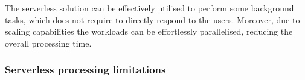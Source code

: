 The serverless solution can be effectively utilised to perform some background tasks, which does not require to directly respond to the users. Moreover, due to scaling capabilities the workloads can be effortlessly parallelised, reducing the overall processing time.







\subsubsection*{Serverless processing limitations}

